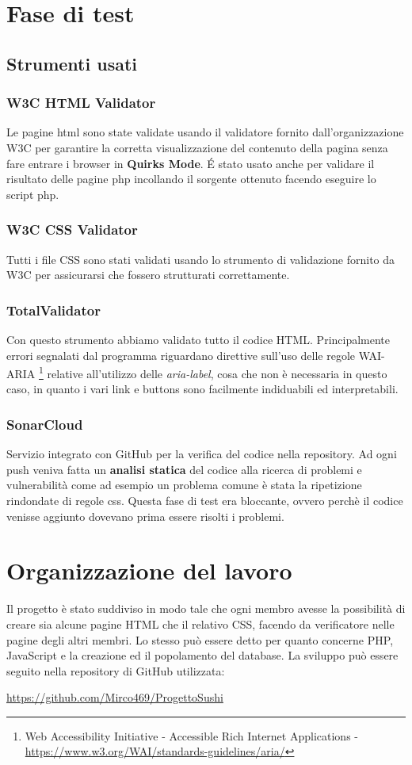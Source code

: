\documentclass{article}
\begin{document}
	\section{Fase di test}
		\subsection{Strumenti usati}
			\subsubsection{W3C HTML Validator}
				Le pagine html sono state validate usando il validatore fornito dall'organizzazione W3C per garantire la corretta visualizzazione del contenuto della pagina senza fare entrare i browser in {\bfseries Quirks Mode}. \'E stato usato anche per validare il risultato delle pagine php incollando il sorgente ottenuto facendo eseguire lo script php.
			\subsubsection{W3C CSS Validator}
				Tutti i file CSS sono stati validati usando lo strumento di validazione fornito da W3C per assicurarsi che fossero strutturati correttamente.
			\subsubsection{TotalValidator}
			    Con questo strumento abbiamo validato tutto il codice HTML. Principalmente errori segnalati dal programma riguardano direttive sull'uso delle regole WAI-ARIA%
			    \footnote{Web Accessibility Initiative - Accessible Rich Internet Applications -  \url{https://www.w3.org/WAI/standards-guidelines/aria/}}
			    relative all'utilizzo delle \textit{aria-label}, cosa che non è necessaria in questo caso, in quanto i vari link e buttons sono facilmente indiduabili ed interpretabili.
			\subsubsection{SonarCloud}
				Servizio integrato con GitHub per la verifica del codice nella repository. Ad ogni push veniva fatta un {\bfseries analisi statica} del codice alla ricerca di problemi e vulnerabilità come ad esempio un problema comune è stata la ripetizione rindondate di regole css. Questa fase di test era bloccante, ovvero perchè il codice venisse aggiunto dovevano prima essere risolti i problemi.
	\section{Organizzazione del lavoro}
		Il progetto è stato suddiviso in modo tale che ogni membro avesse la possibilità di creare sia alcune pagine HTML che il relativo CSS, facendo da verificatore nelle pagine degli altri membri.
		Lo stesso può essere detto per quanto concerne PHP, JavaScript e la creazione ed il popolamento del database.
		La sviluppo può essere seguito nella repository di GitHub utilizzata:
		\newline
		\newline
		\centerline{ \url{https://github.com/Mirco469/ProgettoSushi}}
\end{document}
